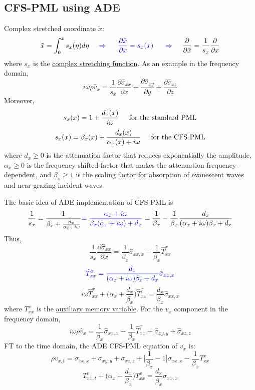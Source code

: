 \documentclass{article}
\newcommand{\myem}[1]{{\color{red}\uline{#1}}}
\newcommand{\myno}[1]{{\color{blue}#1}}
\begin{document}
\subsection{CFS-PML using ADE}
Complex stretched coordinate $\tilde x$:
\[ \tilde x=\int_0^xs_x(\eta)d\eta \myno{ \hspace{5mm}\Rightarrow\hspace{5mm} \frac{\partial\tilde x}{\partial x}=s_x(x) \hspace{5mm}\Rightarrow\hspace{5mm} } \frac{\partial}{\partial\tilde x}=\frac{1}{s_x}\frac{\partial}{\partial x} \]
where $s_x$ is the \myem{complex stretching function}. As an example in the frequency domain,
\[ i\omega\rho\hat v_x=\frac{1}{s_x}\frac{\partial\hat\sigma_{xx}}{\partial x}+\frac{\partial\hat\sigma_{xy}}{\partial y}+\frac{\partial\hat\sigma_{xz}}{\partial z} \]
Moreover,
\[ s_x(x)=1+\frac{d_x(x)}{i\omega} \hspace{5mm}\text{for the standard PML} \]
\[ s_x(x)=\beta_x(x)+\frac{d_x(x)}{\alpha_x(x)+i\omega} \hspace{5mm}\text{for the CFS-PML} \]
where $d_x\geqslant 0$ is the attenuation factor that reduces exponentially the amplitude, $\alpha_x\geqslant 0$ is the frequency-shifted factor that makes the attenuation frequency-dependent, and $\beta_x\geqslant 1$ is the scaling factor for absorption of evanescent waves and near-grazing incident waves.\par
The basic idea of ADE implementation of CFS-PML is
\[ \frac{1}{s_x}=\frac{1}{\beta_x+\frac{d_x}{\alpha_x+i\omega}} \myno{=\frac{\alpha_x+i\omega}{\beta_x(\alpha_x+i\omega)+d_x}} =\frac{1}{\beta_x}-\frac{1}{\beta_x}\frac{d_x}{(\alpha_x+i\omega)\beta_x+d_x} \]
Thus,
\[ \frac{1}{s_x}\frac{\partial\hat\sigma_{xx}}{\partial x}=\frac{1}{\beta_x}\hat\sigma_{xx,x}-\frac{1}{\beta_x}\hat T_{xx}^x \]
\[ \myno{ \hat T_{xx}^x=\frac{d_x}{(\alpha_x+i\omega)\beta_x+d_x}\hat\sigma_{xx,x} } \]
\[ i\omega\hat T_{xx}^x+\Big(\alpha_x+\frac{d_x}{\beta_x}\Big)\hat T_{xx}^x=\frac{d_x}{\beta_x}\hat\sigma_{xx,x} \]
where $T_{xx}^x$ is the \myem{auxiliary memory variable}. For the $v_x$ component in the frequency domain,
\[ i\omega\rho\hat v_x=\frac{1}{\beta_x}\hat\sigma_{xx,x}-\frac{1}{\beta_x}\hat T_{xx}^x+\hat\sigma_{xy,y}+\hat\sigma_{xz,z} \]
FT to the time domain, the ADE CFS-PML equation of $v_x$ is:
\[ \rho v_{x,t}=\sigma_{xx,x}+\sigma_{xy,y}+\sigma_{xz,z}+\Big[\frac{1}{\beta_x}-1\Big]\sigma_{xx,x}-\frac{1}{\beta_x}T_{xx}^x \]
\[ T_{xx,t}^x+\Big(\alpha_x+\frac{d_x}{\beta_x}\Big)T_{xx}^x=\frac{d_x}{\beta_x}\sigma_{xx,x} \]
\end{document}
